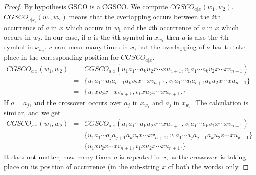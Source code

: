 \documentclass{llncs}
\newcommand{\sa}{crossover~}
\begin{document}
\begin{proof}
\par By hypothesis GSCO is  a CGSCO. We compute $CGSCO_{a|x}(w_1,w_2)$. $CGSCO_{a|x_i}(w_1,w_2)$ means that the overlapping occurs between the $i$th occurrence of $a$ in $x$ which occurs in $w_1$ and the $i$th occurrence of $a$ in $x$ which occurs in $w_2$. In our case, if $a$ is the $i$th symbol in $x_{w_1}$ then $a$ is also the $i$th symbol in $x_{w_2}$. $a$ can occur many times in $x$, but the overlapping of $a$ has to take place in the corresponding position for $CGSCO_{a|x}$.
\begin{eqnarray*}
 CGSCO_{a|x}(w_1,w_2)&=&CGSCO_{a|x}(u_1a_1\cdots a_ku_2x\cdots xu_{n+1},v_1a_1\cdots a_kv_2x\cdots xv_{n+1})\\
        &=&\{u_1a_1\cdots a_la_{l+1}a_kv_2x\cdots xv_{n+1},v_1a_1\cdots a_la_{l+1}a_ku_2x\cdots xu_{n+1}\}\\
        &=&\{u_1xv_2x\cdots xv_{n+1},v_1xu_2x\cdots xu_{n+1}.\}
\end{eqnarray*}
 If $a=a_j$, and  the \sa occurs over $a_j$ in $x_{w_1}$ and   $a_j$ in $x_{w_2}$. The calculation is similar, and we get
\begin{eqnarray*}
 CGSCO_{a|x}(w_1,w_2)&=&CGSCO_{a|x}(u_1a_1\cdots a_ku_2x\cdots xu_{n+1},v_1a_1\cdots a_kv_2x\cdots xv_{n+1})\\
        &=&\{u_1a_1\cdots a_ja_{j+1}a_kv_2x\cdots xv_{n+1},v_1a_1\cdots a_ja_{j+1}a_ku_2x\cdots xu_{n+1}\}\\
        &=&\{u_1xv_2x\cdots xv_{n+1},v_1xu_2x\cdots xu_{n+1}.\}
\end{eqnarray*}
It does not matter, how many times $a$ is repeated in $x$, as the \sa is taking place on its position of occurrence (in the sub-string $x$ of both the words) only.


\end{proof}
\end{document}
